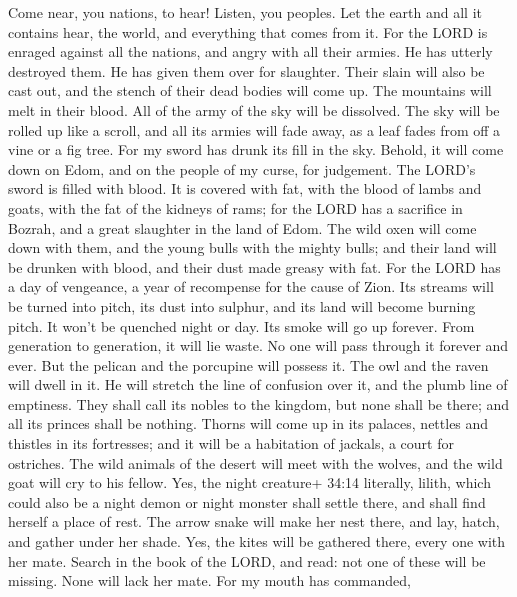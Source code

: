  Come near, you nations, to hear! Listen, you peoples. Let
the earth and all it contains hear, the world, and everything that comes
from it.  For the LORD is enraged against all the nations,
and angry with all their armies. He has utterly destroyed them. He has
given them over for slaughter.  Their slain will also be
cast out, and the stench of their dead bodies will come up. The
mountains will melt in their blood.  All of the army of the
sky will be dissolved. The sky will be rolled up like a scroll, and all
its armies will fade away, as a leaf fades from off a vine or a fig
tree.  For my sword has drunk its fill in the sky. Behold,
it will come down on Edom, and on the people of my curse, for judgement.
 The LORD's sword is filled with blood. It is covered with
fat, with the blood of lambs and goats, with the fat of the kidneys of
rams; for the LORD has a sacrifice in Bozrah, and a great slaughter in
the land of Edom.  The wild oxen will come down with them,
and the young bulls with the mighty bulls; and their land will be
drunken with blood, and their dust made greasy with fat. 
For the LORD has a day of vengeance, a year of recompense for the cause
of Zion.  Its streams will be turned into pitch, its dust
into sulphur, and its land will become burning pitch.  It
won't be quenched night or day. Its smoke will go up forever. From
generation to generation, it will lie waste. No one will pass through it
forever and ever.  But the pelican and the porcupine will
possess it. The owl and the raven will dwell in it. He will stretch the
line of confusion over it, and the plumb line of emptiness.
 They shall call its nobles to the kingdom, but none shall
be there; and all its princes shall be nothing.  Thorns
will come up in its palaces, nettles and thistles in its fortresses; and
it will be a habitation of jackals, a court for ostriches. 
The wild animals of the desert will meet with the wolves, and the wild
goat will cry to his fellow. Yes, the night creature+ 34:14 literally,
lilith, which could also be a night demon or night monster shall settle
there, and shall find herself a place of rest.  The arrow
snake will make her nest there, and lay, hatch, and gather under her
shade. Yes, the kites will be gathered there, every one with her mate.
 Search in the book of the LORD, and read: not one of these
will be missing. None will lack her mate. For my mouth has commanded,

